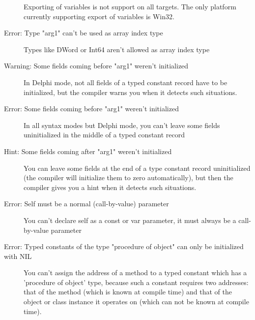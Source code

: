 \begin{description}
 Exporting of variables is not support on all targets. The only platform
 currently supporting export of variables is Win32.
\item [Error: Type "arg1" can't be used as array index type]
 Types like DWord or Int64 aren't allowed as array index type
\item [Warning: Some fields coming before "arg1" weren't initialized]
 In Delphi mode, not all fields of a typed constant record have to be
 initialized, but the compiler warns you when it detects such situations.
\item [Error: Some fields coming before "arg1" weren't initialized]
 In all syntax modes but Delphi mode, you can't leave some fields uninitialized
 in the middle of a typed constant record
\item [Hint: Some fields coming after "arg1" weren't initialized]
 You can leave some fields at the end of a type constant record uninitialized
 (the compiler will initialize them to zero automatically), but then the
 compiler gives you a hint when it detects such situations.
\item [Error: Self must be a normal (call-by-value) parameter]
 You can't declare self as a const or var parameter, it must always be
 a call-by-value parameter
\item [Error: Typed constants of the type "procedure of object" can only be initialized with NIL]
 You can't assign the address of a method to a typed constant which has a
 'procedure of object' type, because such a constant requires two addresses:
 that of the method (which is known at compile time) and that of the object or
 class instance it operates on (which can not be known at compile time).
 \end{description}
